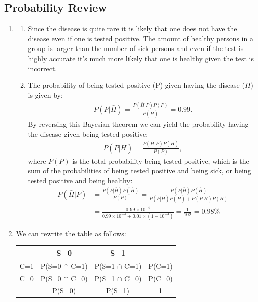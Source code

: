 \documentclass[12pt]{article}
\begin{document}
\subsection{Probability Review}

\begin{enumerate}
	\item 
	\begin{enumerate}[label=(\alph*)]
		\item Since the disease is quite rare it is likely that one does not have the disease even if one is tested positive. The amount of healthy persons in a group is larger than the number of sick persons and even if the test is highly accurate it's much more likely that one is healthy given the test is incorrect. 
		\item The probability of being tested positive (P) given having the disease ($\bar{H}$) is given by:
		\begin{align}
			P(P|\bar{H})=\frac{P(\bar{H}|P)P(P)}{P(\bar{H})}=0.99.
		\end{align}
		By reversing this Bayesian theorem we can yield the probability having the disease given being tested positive:
		\begin{align}
			P(P|\bar{H})=\frac{P(\bar{H}|P)P(\bar{H})}{P(P)},
		\end{align}
		where $P(P)$ is the total probability being tested positive, which is the sum of the probabilities of being tested positive and being sick, or being tested positive and being healthy:
		\begin{align}
		P(\bar{H}|P)&=\frac{P(P|\bar{H})P(\bar{H})}{P(P)}=\frac{P(P|\bar{H})P(\bar{H})}{P(P|\bar{H})P(\bar{H})+P(P|H)P(H)}\\
		&=\frac{0.99\times 10^{-4}}{0.99\times 10^{-4}+0.01\times(1-10^{-4})}=\frac{1}{102}=0.98\%
		\end{align}
	\end{enumerate}
	\item We can rewrite the table as follows:
	\begin{table}[h!]
		\centering
		\begin{tabular}{|c|c|c|c|}
			\toprule
			& S=0   & S=1   &  \\
			\midrule
			C=1   & P(S=0 $\cap$ C=1)    & P(S=1 $\cap$ C=1)    & P(C=1) \\
			\midrule
			C=0   & P(S=0 $\cap$ C=0)    & P(S=1 $\cap$ C=0)    & P(C=0) \\
			\midrule
			& P(S=0) & P(S=1) & 1 \\

\end{tabular}
\end{table}
\end{enumerate}
\end{document}
